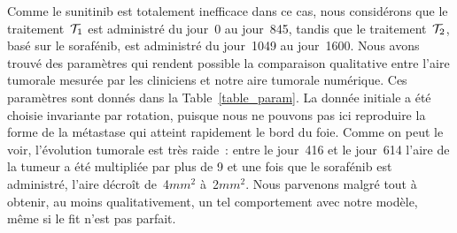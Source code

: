 \documentclass[main.tex]{subfiles}
\begin{document}
Comme le sunitinib est totalement inefficace dans ce cas, nous considérons que le 
traitement~${\mathcal T_1}$ est administré du jour~0 au jour~845, tandis que le 
traitement~${\mathcal T_2}$, basé sur le sorafénib, est administré du jour~1049 au jour~1600. 
Nous avons trouvé des paramètres qui rendent possible la comparaison qualitative entre l'aire tumorale mesurée par les cliniciens et notre aire tumorale numérique. Ces paramètres sont donnés dans la  Table~\ref{table_param}. 
La donnée initiale a été choisie invariante par rotation, puisque nous ne pouvons pas %
ici reproduire la forme de la métastase qui atteint rapidement le bord du foie.
Comme on peut le voir, l'évolution tumorale est très raide~: entre le  jour~416 et le jour~614 l'aire de la tumeur a été multipliée par plus de 9 et une fois que le sorafénib est administré, l'aire décroît de~4\;$mm^2$ à~2\;$mm^2$. Nous parvenons malgré tout à obtenir, au moins qualitativement, un tel comportement avec notre modèle, même si le fit n'est pas parfait. 
\end{document}
